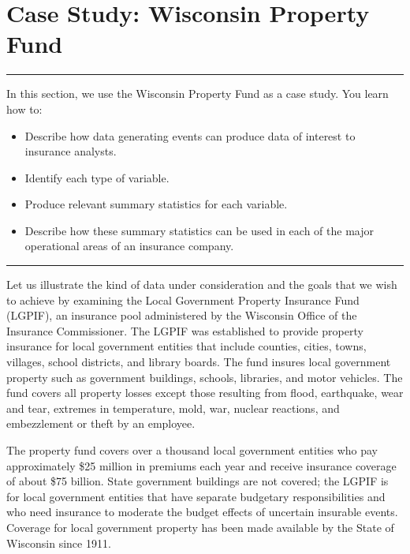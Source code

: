 \documentclass[]{book}
\providecommand{\tightlist}{%
  \setlength{\itemsep}{0pt}\setlength{\parskip}{0pt}}
\theoremstyle{definition}
\theoremstyle{definition}
\theoremstyle{definition}
\theoremstyle{remark}
\begin{document}
\section{Case Study: Wisconsin Property Fund}\label{S:LGPIF}

\begin{center}\rule{0.5\linewidth}{\linethickness}\end{center}

In this section, we use the Wisconsin Property Fund as a case study. You
learn how to:

\begin{itemize}
\tightlist
\item
  Describe how data generating events can produce data of interest to
  insurance analysts.
\item
  Identify each type of variable.
\item
  Produce relevant summary statistics for each variable.
\item
  Describe how these summary statistics can be used in each of the major
  operational areas of an insurance company.
\end{itemize}

\begin{center}\rule{0.5\linewidth}{\linethickness}\end{center}

Let us illustrate the kind of data under consideration and the goals
that we wish to achieve by examining the Local Government Property
Insurance Fund (LGPIF), an insurance pool administered by the Wisconsin
Office of the Insurance Commissioner. The LGPIF was established to
provide property insurance for local government entities that include
counties, cities, towns, villages, school districts, and library boards.
The fund insures local government property such as government buildings,
schools, libraries, and motor vehicles. The fund covers all property
losses except those resulting from flood, earthquake, wear and tear,
extremes in temperature, mold, war, nuclear reactions, and embezzlement
or theft by an employee.

The property fund covers over a thousand local government entities who
pay approximately \$25 million in premiums each year and receive
insurance coverage of about \$75 billion. State government buildings are
not covered; the LGPIF is for local government entities that have
separate budgetary responsibilities and who need insurance to moderate
the budget effects of uncertain insurable events. Coverage for local
government property has been made available by the State of Wisconsin
since 1911.
\end{document}
